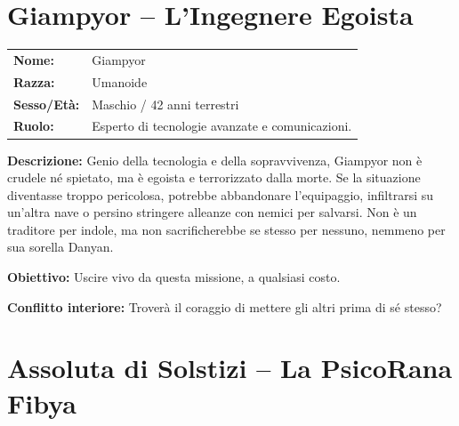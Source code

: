 \documentclass[11pt,a4paper]{article}
\begin{document}
\section{Giampyor – L’Ingegnere Egoista}

\begin{tcolorbox}[colback=mininglightorange!20, colframe=miningorange]
\begin{tabularx}{\textwidth}{lX}
\textbf{Nome:} & Giampyor \\
\textbf{Razza:} & Umanoide \\
\textbf{Sesso/Età:} & Maschio / 42 anni terrestri \\
\textbf{Ruolo:} & Esperto di tecnologie avanzate e comunicazioni. \\
\end{tabularx}

\textbf{Descrizione:} Genio della tecnologia e della sopravvivenza, Giampyor non è crudele né spietato, ma è egoista e terrorizzato dalla morte. Se la situazione diventasse troppo pericolosa, potrebbe abbandonare l’equipaggio, infiltrarsi su un’altra nave o persino stringere alleanze con nemici per salvarsi. Non è un traditore per indole, ma non sacrificherebbe se stesso per nessuno, nemmeno per sua sorella Danyan.


\textbf{Obiettivo:} Uscire vivo da questa missione, a qualsiasi costo.

\textbf{Conflitto interiore:} Troverà il coraggio di mettere gli altri prima di sé stesso?
\end{tcolorbox}



\section{Assoluta di Solstizi – La PsicoRana Fibya}
\end{document}
